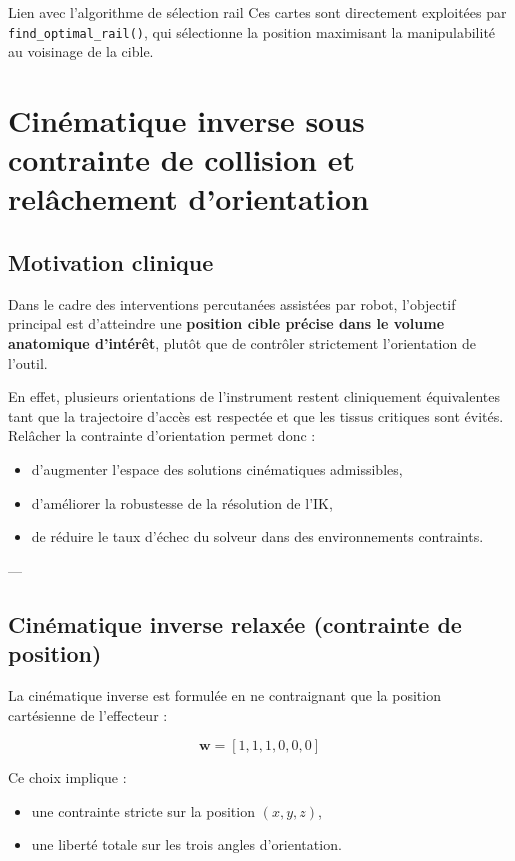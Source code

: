 \documentclass[11pt, a4paper]{article}
\begin{document}
\begin{techbox}{Lien avec l’algorithme de sélection rail}
Ces cartes sont directement exploitées par \texttt{find\_optimal\_rail()}, qui sélectionne la position maximisant la manipulabilité au voisinage de la cible.
\end{techbox}

\section{Cinématique inverse sous contrainte de collision et relâchement d'orientation}

\subsection{Motivation clinique}

Dans le cadre des interventions percutanées assistées par robot, l’objectif principal est d’atteindre une \textbf{position cible précise dans le volume anatomique d’intérêt}, plutôt que de contrôler strictement l’orientation de l’outil.

En effet, plusieurs orientations de l’instrument restent cliniquement équivalentes tant que la trajectoire d’accès est respectée et que les tissus critiques sont évités.  
Relâcher la contrainte d’orientation permet donc :
\begin{itemize}
  \item d’augmenter l’espace des solutions cinématiques admissibles,
  \item d’améliorer la robustesse de la résolution de l’IK,
  \item de réduire le taux d’échec du solveur dans des environnements contraints.
\end{itemize}

---

\subsection{Cinématique inverse relaxée (contrainte de position)}

La cinématique inverse est formulée en ne contraignant que la position cartésienne de l’effecteur :

\begin{equation}
\mathbf{w} = [1, 1, 1, 0, 0, 0]
\end{equation}

Ce choix implique :
\begin{itemize}
  \item une contrainte stricte sur la position $(x,y,z)$,
  \item une liberté totale sur les trois angles d’orientation.
\end{itemize}
\end{document}
